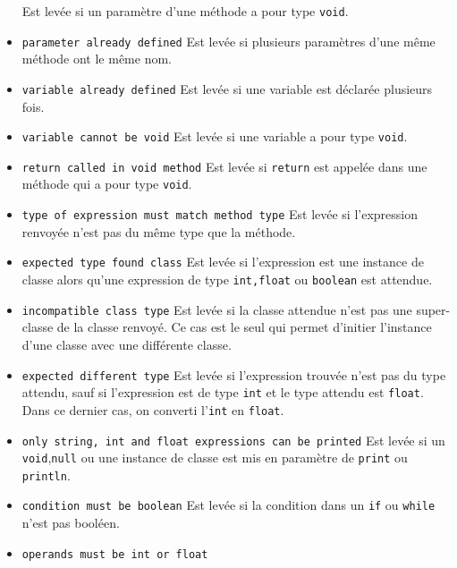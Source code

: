 \documentclass[a4paper]{article}
\begin{document}
\begin{itemize}
\newline
Est levée si un paramètre d'une méthode a pour type \texttt{void}.
\item \texttt{parameter already defined}
\newline
Est levée si plusieurs paramètres d'une même méthode ont le même nom.
\item \texttt{variable already defined}
\newline
Est levée si une variable est déclarée plusieurs fois.
\item \texttt{variable cannot be void}
\newline
Est levée si une variable a pour type \texttt{void}.
\item \texttt{return called in void method}
\newline 
Est levée si \texttt{return} est appelée dans une méthode qui a pour type \texttt{void}.
\item \texttt{type of expression must match method type}
\newline
Est levée si l'expression renvoyée n'est pas du même type que la méthode.
\item \texttt{expected type found class}
\newline
Est levée si l'expression est une instance de classe alors qu'une expression de type \texttt{int,float} ou \texttt{boolean} est attendue.
\item \texttt{incompatible class type}
\newline
Est levée si la classe attendue n'est pas une super-classe de la classe renvoyé. Ce cas est le seul qui permet d'initier l'instance d'une classe avec une différente classe.
\item \texttt{expected different type}
\newline
Est levée si l'expression trouvée n'est pas du type attendu, sauf si l'expression est de type \texttt{int} et le type attendu est \texttt{float}. Dans ce dernier cas, on converti l'\texttt{int} en \texttt{float}.
\item \texttt{only string, int and float expressions can be printed}
\newline
Est levée si un \texttt{void},\texttt{null} ou une instance de classe est mis en paramètre de \texttt{print} ou \texttt{println}.
\item \texttt{condition must be boolean}
\newline
Est levée si la condition dans un \texttt{if} ou \texttt{while} n'est pas booléen.
\item \texttt{operands must be int or float}

\end{itemize}
\end{document}
